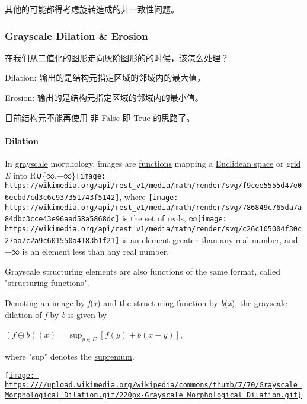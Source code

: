 \documentclass[
]{article}
\begin{document}
其他的可能都得考虑旋转造成的非一致性问题。

\hypertarget{header-n18}{%
\subsubsection{Grayscale Dilation \& Erosion}\label{header-n18}}

在我们从二值化的图形走向灰阶图形的的时候，该怎么处理？

Dilation: 输出的是结构元指定区域的邻域内的最大值，

Erosion: 输出的是结构元指定区域的邻域内的最小值。

目前结构元不能再使用 非 False 即 True 的思路了。

\hypertarget{header-n23}{%
\paragraph{Dilation}\label{header-n23}}

In \href{https://en.wikipedia.org/wiki/Grayscale}{grayscale} morphology,
images are
\href{https://en.wikipedia.org/wiki/Function_(mathematics)}{functions}
mapping a \href{https://en.wikipedia.org/wiki/Euclidean_space}{Euclidean
space} or \href{https://en.wikipedia.org/wiki/Lattice_graph}{grid}
\emph{E} into
R∪\{∞,−∞\}\texttt{[image: https://wikimedia.org/api/rest\_v1/media/math/render/svg/f9cee5555d47e06ecbd7cd3c6c937351743f5142]},
where
\texttt{[image: https://wikimedia.org/api/rest\_v1/media/math/render/svg/786849c765da7a84dbc3cce43e96aad58a5868dc]}
is the set of \href{https://en.wikipedia.org/wiki/Real_numbers}{reals},
∞\texttt{[image: https://wikimedia.org/api/rest\_v1/media/math/render/svg/c26c105004f30c27aa7c2a9c601550a4183b1f21]}
is an element greater than any real number, and −∞ is an element less
than any real number.

Grayscale structuring elements are also functions of the same format,
called "structuring functions".

Denoting an image by \emph{f}(\emph{x}) and the structuring function by
\emph{b}(\emph{x}), the grayscale dilation of \emph{f} by \emph{b} is
given by

\((f\oplus b)(x)=\sup _{{y\in E}}[f(y)+b(x-y)]\),

where "sup" denotes the
\href{https://en.wikipedia.org/wiki/Supremum}{supremum}.

\href{https://en.wikipedia.org/wiki/File:Grayscale_Morphological_Dilation.gif}{\texttt{[image: https:////upload.wikimedia.org/wikipedia/commons/thumb/7/70/Grayscale\_Morphological\_Dilation.gif/220px-Grayscale\_Morphological\_Dilation.gif]}}
\end{document}
